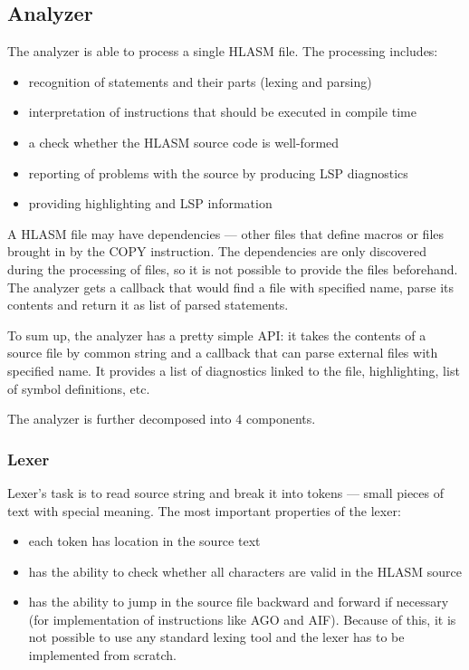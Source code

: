 \subsection{Analyzer}

The analyzer is able to process a single HLASM file. The processing includes:
\begin{itemize}
 \item recognition of statements and their parts (lexing and parsing)
 \item interpretation of instructions that should be executed in compile time
 \item a check whether the HLASM source code is well-formed
 \item reporting of problems with the source by producing LSP diagnostics
 \item providing highlighting and LSP information
\end{itemize}

A HLASM file may have dependencies --- other files that define macros or files brought in by the COPY instruction. The dependencies are only discovered during the processing of files, so it is not possible to provide the files beforehand. The analyzer gets a callback that would find a file with specified name, parse its contents and return it as list of parsed statements. 

To sum up, the analyzer has a pretty simple API: it takes the contents of a source file by common string and a callback that can parse external files with specified name. It provides a list of diagnostics linked to the file, highlighting, list of symbol definitions, etc.

The analyzer is further decomposed into 4 components.

\subsubsection{Lexer}

Lexer's task is to read source string and break it into tokens --- small pieces of text with special meaning. The most important properties of the lexer:
\begin{itemize}
	\item each token has location in the source text
	\item has the ability to check whether all characters are valid in the HLASM source
	\item has the ability to jump in the source file backward and forward if necessary (for implementation of instructions like AGO and AIF). Because of this, it is not possible to use any standard lexing tool and the lexer has to be implemented from scratch.
\end{itemize}

